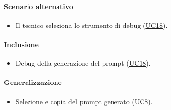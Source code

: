 \paragraph*{Scenario alternativo}
\begin{itemize}
  \item Il tecnico seleziona lo strumento di debug (\hyperref[UC18]{UC18}).
\end{itemize}

\paragraph*{Inclusione}
\begin{itemize}
  \item Debug della generazione del prompt (\hyperref[UC18]{UC18}).
\end{itemize}

\paragraph*{Generalizzazione}
\begin{itemize}
    \item Selezione e copia del prompt generato (\hyperref[UC8]{UC8}).
\end{itemize}